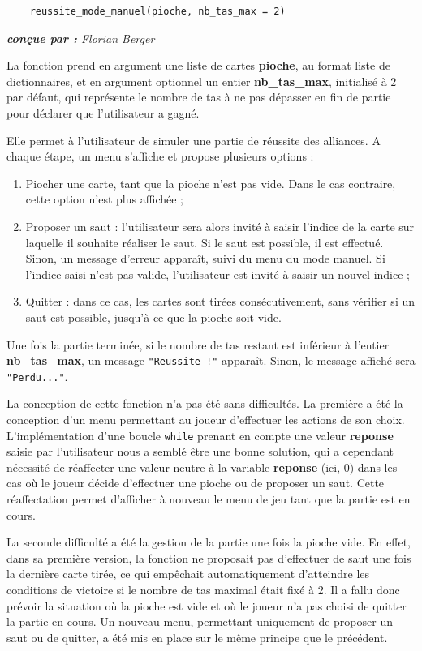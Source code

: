 \documentclass[titlepage]{article}
\begin{document}
\noindent	\begin{minipage}{\textwidth}
	\begin{lstlisting}
	reussite_mode_manuel(pioche, nb_tas_max = 2)
	\end{lstlisting}	
	\end{minipage}

\emph{\textbf{conçue par : } Florian Berger} \vspace{2mm}\par
La fonction prend en argument une liste de cartes \textbf{pioche}, au format liste de dictionnaires, et en argument optionnel un entier \textbf{nb\_tas\_max}, initialisé à 2 par défaut, qui représente le nombre de tas à ne pas dépasser en fin de partie pour déclarer que l'utilisateur a gagné.\par
Elle permet à l'utilisateur de simuler une partie de réussite des alliances. A chaque étape, un menu s'affiche et propose plusieurs options :
	\begin{enumerate}
	\item Piocher une carte, tant que la pioche n'est pas vide. Dans le cas contraire, cette option n'est plus affichée ;
	\item Proposer un saut : l'utilisateur sera alors invité à saisir l'indice de la carte sur laquelle il souhaite réaliser le saut. Si le saut est possible, il est effectué. Sinon, un message d'erreur apparaît, suivi du menu du mode manuel. Si l'indice saisi n'est pas valide, l'utilisateur est invité à saisir un nouvel indice ;
	\item Quitter : dans ce cas, les cartes sont tirées consécutivement, sans vérifier si un saut est possible, jusqu'à ce que la pioche soit vide.
	\end{enumerate}\par

Une fois la partie terminée, si le nombre de tas restant est inférieur à l'entier \textbf{nb\_tas\_max}, un message \texttt{"Reussite !"} apparaît. Sinon, le message affiché sera \texttt{"Perdu..."}.\par
La conception de cette fonction n'a pas été sans difficultés. La première a été la conception d'un menu permettant au joueur d'effectuer les actions de son choix. L'implémentation d'une boucle \texttt{while} prenant en compte une valeur \textbf{reponse} saisie par l'utilisateur nous a semblé être une bonne solution, qui a cependant nécessité de réaffecter une valeur neutre à la variable \textbf{reponse} (ici, 0) dans les cas où le joueur décide d'effectuer une pioche ou de proposer un saut. Cette réaffectation permet d'afficher à nouveau le menu de jeu tant que la partie est en cours.\par
La seconde difficulté a été la gestion de la partie une fois la pioche vide. En effet, dans sa première version, la fonction ne proposait pas d'effectuer de saut une fois la dernière carte tirée, ce qui empêchait automatiquement d'atteindre les conditions de victoire si le nombre de tas maximal était fixé à 2. Il a fallu donc prévoir la situation où la pioche est vide et où le joueur n'a pas choisi de quitter la partie en cours. Un nouveau menu, permettant uniquement de proposer un saut ou de quitter, a été mis en place sur le même principe que le précédent.
\end{document}
